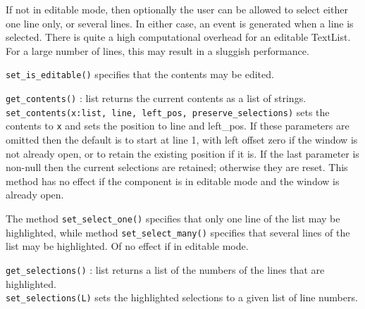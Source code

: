 If not in editable mode, then optionally the user can be allowed to
select either one line only, or several lines. In either case, an
event is generated when a line is selected. There is quite a high
computational overhead for an editable TextList. For a large number of
lines, this may result in a sluggish performance.

\texttt{set\_is\_editable()} specifies that the contents may be edited.

\texttt{get\_contents()} : list returns the current contents as a list of
strings.\\
\texttt{set\_contents(x:list, line, left\_pos, preserve\_selections)} sets the
contents to \texttt{x} and sets the position to line and left\_pos. If
these parameters are omitted then the default is to start at line 1,
with left offset zero if the window is not already open, or to retain
the existing position if it is. If the last parameter is non-null then
the current selections are retained; otherwise they are reset. This
method has no effect if the component is in editable mode and the
window is already open.


The method \texttt{set\_select\_one()} specifies that only one line of the list
may be highlighted, while method \texttt{set\_select\_many()} specifies that
several lines of the list may be highlighted. Of no effect if in editable mode.

\texttt{get\_selections()} : list returns a list of the numbers of the lines
that are highlighted.\\
\texttt{set\_selections(L)} sets the highlighted selections to a
given list of line numbers.


